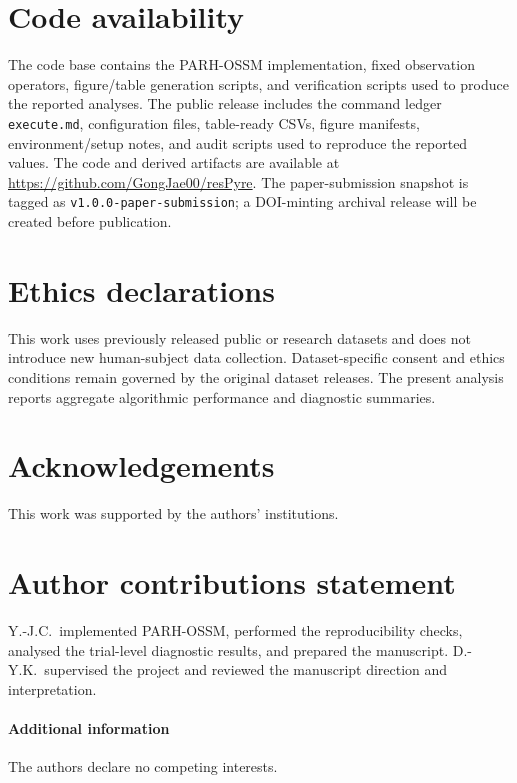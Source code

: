 \documentclass[fleqn,10pt]{wlscirep}
\begin{document}
\section*{Code availability}
The code base contains the PARH-OSSM implementation, fixed observation
operators, figure/table generation scripts, and verification scripts used to produce
the reported analyses. The public release includes the command ledger
\texttt{execute.md}, configuration files, table-ready CSVs, figure manifests,
environment/setup notes, and audit scripts used to reproduce the reported
values. The code and derived artifacts are available at
\url{https://github.com/GongJae00/resPyre}. The paper-submission snapshot is
tagged as \texttt{v1.0.0-paper-submission}; a DOI-minting archival release will
be created before publication.

\section*{Ethics declarations}
This work uses previously released public or research datasets and does not
introduce new human-subject data collection. Dataset-specific consent and
ethics conditions remain governed by the original dataset releases. The present
analysis reports aggregate algorithmic performance and diagnostic summaries.

\begingroup
\small

\endgroup

\section*{Acknowledgements}
This work was supported by the authors' institutions.

\section*{Author contributions statement}
Y.-J.C.\ implemented PARH-OSSM, performed the reproducibility checks, analysed
the trial-level diagnostic results, and prepared the manuscript. D.-Y.K.\
supervised the project and reviewed the manuscript direction and interpretation.

\paragraph*{Additional information}
The authors declare no competing interests.
\end{document}

